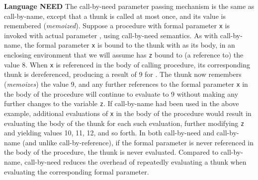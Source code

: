 \begin{minipage}[t]{\sw}
\slidenumber
\LARGE
{\bf Language NEED}\exx
The call-by-need parameter passing mechanism
is the same as call-by-name,
except that a thunk is called at most once,
and its value is remembered ({\em memoized}).\exx
Suppose a procedure with formal parameter \verb'x' is invoked
with actual parameter ,
using call-by-need semantics.
As with call-by-name, the formal parameter \verb'x' is bound to the thunk
with  as its body,
in an enclosing environment
that we will assume has \verb'z' bound to (a reference to) the value 8.
When \verb'x' is referenced in the body of calling procedure,
its corresponding thunk is dereferenced,
producing a result of 9 for .
The thunk now remembers ({\em memoizes}) the value 9,
and any further references to the formal parameter \verb'x'
in the body of the procedure will continue to evaluate to 9
without making any further changes to the variable \verb'z'.\exx
If call-by-name had been used in the above example,
additional evaluations of \verb'x' in the body of the procedure would result
in evaluating the body of the thunk for each such evaluation,
further modifying \verb'z'
and yielding values 10, 11, 12, and so forth.\exx
In both call-by-need and call-by-name
(and unlike call-by-reference),
if the formal parameter is never referenced
in the body of the procedure, the thunk is never evaluated.
Compared to call-by-name,
call-by-need reduces the overhead of repeatedly evaluating
a thunk when evaluating the corresponding formal parameter.
\end{minipage}
\clearpage
